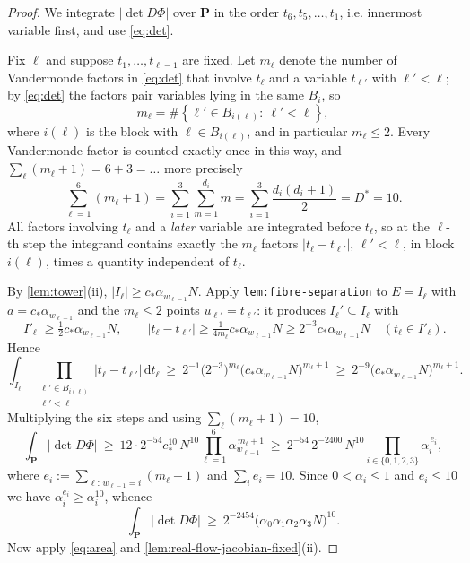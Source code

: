 \documentclass[11pt]{article}
\newcommand{\dd}{\,\mathrm{d}}
\newcommand{\abs}[1]{\left|#1\right|}
\newcommand{\set}[1]{\left\{#1\right\}}
\newcommand{\Idx}{\{0,1,2,3\}}
\begin{document}
\begin{proof}
  We integrate $\abs{\det D\Phi}$ over $\mathbf P$ in the order
  $t_6,t_5,\dots,t_1$, i.e. innermost variable first, and use \eqref{eq:det}.

  Fix $\ell$ and suppose $t_1,\dots,t_{\ell-1}$ are fixed.  Let
  $m_\ell$ denote the number of Vandermonde factors in \eqref{eq:det} that involve
  $t_\ell$ and a variable $t_{\ell'}$ with $\ell'<\ell$; by \eqref{eq:det} the
  factors pair variables lying in the same $B_i$, so
  \[
    m_\ell=\#\set{\ell'\in B_{i(\ell)}:\ \ell'<\ell},
  \]
  where $i(\ell)$ is the block with $\ell\in B_{i(\ell)}$, and in particular
  $m_\ell\leq2$.  Every Vandermonde factor is counted exactly once in this way,
  and $\sum_\ell(m_\ell+1)=6+3=\ldots$ more precisely
  \[
    \sum_{\ell=1}^{6}(m_\ell+1)=\sum_{i=1}^{3}\sum_{m=1}^{d_i}m
    =\sum_{i=1}^3\frac{d_i(d_i+1)}2=D^\ast=10 .
  \]
  All factors involving $t_\ell$ and a \emph{later} variable are integrated
  before $t_\ell$, so at the $\ell$-th step the integrand contains exactly the
  $m_\ell$ factors $\abs{t_\ell-t_{\ell'}}$, $\ell'<\ell$, in block $i(\ell)$,
  times a quantity independent of $t_\ell$.

  By \cref{lem:tower}(ii), $\abs{I_\ell}\geq c_\ast\alpha_{w_{\ell-1}}N$.  Apply
  \texttt{lem:fibre-separation} to $E=I_\ell$ with $a=c_\ast\alpha_{w_{\ell-1}}$
  and the $m_\ell\leq2$ points $u_{\ell'}=t_{\ell'}$: it produces
  $I_\ell'\subseteq I_\ell$ with
  \[
    \abs{I'_\ell}\geq\tfrac12 c_\ast\alpha_{w_{\ell-1}}N,\qquad
    \abs{t_\ell-t_{\ell'}}\geq\tfrac{1}{4m_\ell}c_\ast\alpha_{w_{\ell-1}}N
    \geq 2^{-3}c_\ast\alpha_{w_{\ell-1}}N \quad(t_\ell\in I'_\ell).
  \]
  Hence
  \[
    \int_{I_\ell}\ \prod_{\substack{\ell'\in B_{i(\ell)}\\ \ell'<\ell}}\abs{t_\ell-t_{\ell'}}\dd t_\ell
    \ \geq\ 2^{-1}\bigl(2^{-3}\bigr)^{m_\ell}
    \bigl(c_\ast\alpha_{w_{\ell-1}}N\bigr)^{m_\ell+1}
    \ \geq\ 2^{-9}\bigl(c_\ast\alpha_{w_{\ell-1}}N\bigr)^{m_\ell+1}.
  \]
  Multiplying the six steps and using $\sum_\ell(m_\ell+1)=10$,
  \[
    \int_{\mathbf P}\abs{\det D\Phi}
    \ \geq\ 12\cdot2^{-54}c_\ast^{10}\,N^{10}
    \prod_{\ell=1}^{6}\alpha_{w_{\ell-1}}^{\,m_\ell+1}
    \ \geq\ 2^{-54}\,2^{-2400}\,N^{10}\prod_{i\in\Idx}\alpha_i^{\,e_i},
  \]
  where $e_i:=\sum_{\ell:\,w_{\ell-1}=i}(m_\ell+1)$ and $\sum_ie_i=10$.  Since
  $0<\alpha_i\leq1$ and $e_i\leq10$ we have
  $\alpha_i^{e_i}\geq\alpha_i^{10}$, whence
  \[
    \int_{\mathbf P}\abs{\det D\Phi}\ \geq\ 2^{-2454}\bigl(\alpha_0\alpha_1\alpha_2\alpha_3N\bigr)^{10}.
  \]
  Now apply \eqref{eq:area} and \cref{lem:real-flow-jacobian-fixed}(ii).
\end{proof}
\end{document}
